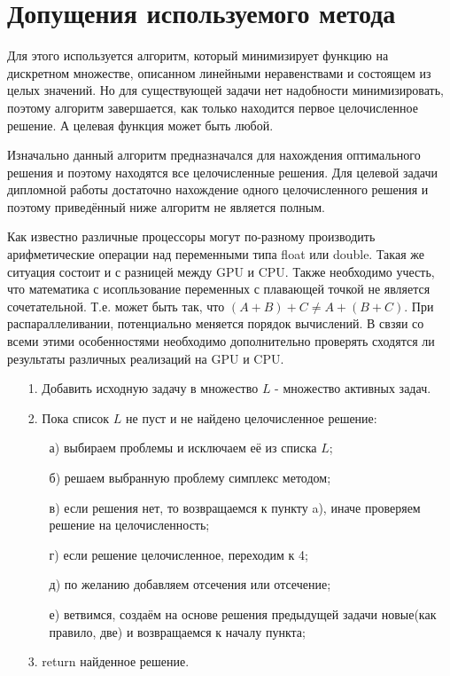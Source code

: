 \documentclass[a4paper,14pt,russian]{extreport}
\begin{document}
\section{Допущения используемого метода}
Для этого используется алгоритм, который минимизирует функцию на дискретном множестве, описанном линейными неравенствами и состоящем из целых значений. Но для существующей задачи нет надобности минимизировать, поэтому алгоритм завершается, как только находится первое целочисленное решение. А целевая функция может быть любой. 
\par
Изначально данный алгоритм предназначался для нахождения оптимального решения и поэтому находятся все целочисленные решения. Для целевой задачи дипломной работы достаточно нахождение одного целочисленного решения и поэтому приведённый ниже алгоритм не является полным. 
\par
Как известно различные процессоры могут по-разному производить арифметические операции над переменными типа float или double. Такая же ситуация состоит и с разницей между GPU и CPU. Также необходимо учесть, что математика с исопльзование переменных с плавающей точкой не является сочетательной. Т.е. может быть так, что $(A+B)+C\neq A+(B+C)$. При распараллеливании, потенциально меняется порядок вычислений. В свзяи со всеми этими особенностями необходимо дополнительно проверять сходятся ли результаты различных реализаций на GPU и CPU. 
\par

\begin{enumerate}
\item[1.]
Добавить исходную задачу в множество $L$ - множество активных задач.
\item[2.]
Пока список $L$ не пуст и не найдено целочисленное решение:
\begin{enumerate}
\item[а)] выбираем проблемы и исключаем её из списка $L$;
\item[б)] решаем выбранную проблему симплекс методом;
\item[в)] если решения нет, то возвращаемся к пункту a), иначе проверяем решение на целочисленность;
\item[г)] если решение целочисленное, переходим к 4;
\item[д)] по желанию добавляем отсечения или отсечение;
\item[е)] ветвимся, создаём на основе решения предыдущей задачи новые(как правило, две) и возвращаемся к началу пункта;
\end{enumerate}
\item[3.] return найденное решение.
\end{enumerate}
\end{document}
